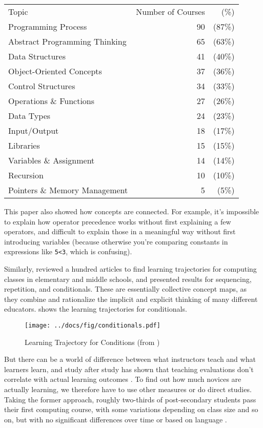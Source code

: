 {\small
\begin{longtable}{lrr}
  Topic & Number of Courses & (\%) \\
  Programming Process & 90 & (87\%) \\
  Abstract Programming Thinking & 65 & (63\%) \\
  Data Structures & 41 & (40\%) \\
  Object-Oriented Concepts & 37 & (36\%) \\
  Control Structures & 34 & (33\%) \\
  Operations \& Functions & 27 & (26\%) \\
  Data Types & 24 & (23\%) \\
  Input/Output & 18 & (17\%) \\
  Libraries & 15 & (15\%) \\
  Variables \& Assignment & 14 & (14\%) \\
  Recursion & 10 & (10\%) \\
  Pointers \& Memory Management & 5 & (5\%) \\
\end{longtable}
}

This paper also showed how concepts are connected.  For example, it's
impossible to explain how operator precedence works without first
explaining a few operators, and difficult to explain those in a
meaningful way without first introducing variables (because otherwise
you're comparing constants in expressions like \texttt{5{\textless}3},
which is confusing).

Similarly, \cite{Rich2017} reviewed a hundred articles to find
learning trajectories for computing classes in elementary and middle
schools, and presented results for sequencing, repetition, and
conditionals.  These are essentially collective concept maps, as they
combine and rationalize the implicit and explicit thinking of many
different educators.   shows the learning
trajectories for conditionals.

\begin{figure}
\centering
\texttt{[image: ../docs/fig/conditionals.pdf]}
\caption{Learning Trajectory for Conditions (from \cite{Rich2017})}
\label{f:pck-trajectory}
\end{figure}

But there can be a world of difference between what instructors teach
and what learners learn, and study after study has shown that teaching
evaluations don't correlate with actual learning outcomes
\cite{Star2014,Uttl2017}.  To find out how much novices are actually
learning, we therefore have to use other measures or do direct
studies.  Taking the former approach, roughly two-thirds of
post-secondary students pass their first computing course, with some
variations depending on class size and so on, but with no significant
differences over time or based on language \cite{Benn2007a,Wats2014}.

